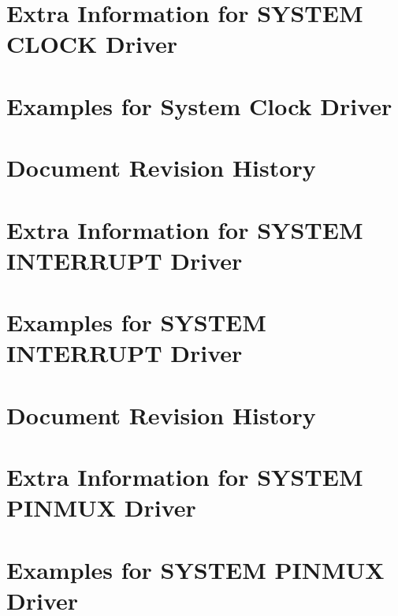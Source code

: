 \documentclass[twoside]{book}
\newcommand{\+}{\discretionary{\mbox{\scriptsize$\hookleftarrow$}}{}{}}
\begin{document}
\chapter{Extra Information for SYSTEM CLOCK Driver}
\label{asfdoc_sam0_system_clock_extra}

\chapter{Examples for System Clock Driver}
\label{asfdoc_sam0_system_clock_exqsg}

\chapter{Document Revision History}
\label{asfdoc_sam0_system_clock_document_revision_history}

\chapter{Extra Information for SYSTEM INTERRUPT Driver}
\label{asfdoc_sam0_system_interrupt_extra}

\chapter{Examples for SYSTEM INTERRUPT Driver}
\label{asfdoc_sam0_system_interrupt_exqsg}

\chapter{Document Revision History}
\label{asfdoc_sam0_system_interrupt_document_revision_history}

\chapter{Extra Information for SYSTEM PINMUX Driver}
\label{asfdoc_sam0_system_pinmux_extra}

\chapter{Examples for SYSTEM PINMUX Driver}
\label{asfdoc_sam0_system_pinmux_exqsg}

\end{document}
